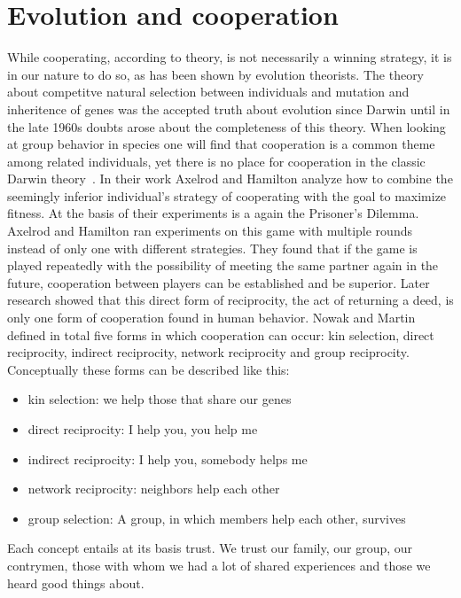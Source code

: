 \section{Evolution and cooperation}
While cooperating, according to theory, is not necessarily a winning strategy, it is in our nature 
to do so, as has been shown by evolution theorists. The theory about competitve natural selection between individuals and mutation and inheritence of genes was the accepted truth about evolution since Darwin until in the late 1960s doubts arose about the completeness of this 
theory. When looking at group behavior in species one will find that cooperation is a common theme
among related individuals, yet there is no place for cooperation in the classic Darwin 
theory~\cite{Axelrod1390}. In their work Axelrod and Hamilton \cite{Axelrod1390} 
analyze how to combine the seemingly inferior individual's strategy of cooperating with the goal to 
maximize fitness. At the basis of their experiments is a again the Prisoner's 
Dilemma. Axelrod and Hamilton ran experiments on this game with multiple rounds instead of only one with
different strategies. They found that if the game is played repeatedly with the possibility of 
meeting the same partner again in the future, cooperation between players can be established and be
superior. Later research showed that this direct form of reciprocity, the act of returning a deed,
is only one form of cooperation found in human behavior. Nowak and 
Martin~\cite{nowak2006five} defined in total five forms in which cooperation can occur: kin selection, direct
reciprocity, indirect reciprocity, network reciprocity and group reciprocity. Conceptually these 
forms can be described like this:

\begin{itemize}
    \item kin selection: we help those that share our genes
    \item direct reciprocity: I help you, you help me
    \item indirect reciprocity: I help you, somebody helps me
    \item network reciprocity: neighbors help each other
    \item group selection: A group, in which members help each other, survives
\end{itemize}

Each concept entails at its basis trust. We trust our family, our group, our contrymen, those with whom we had a lot
of shared experiences and those we heard good things about. 

